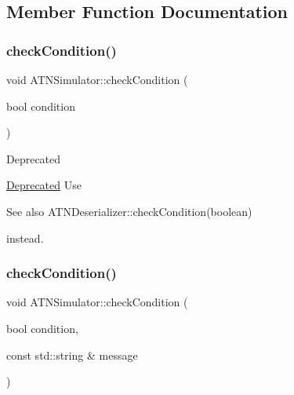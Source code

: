 \subsection{Member Function Documentation}
\mbox{\label{classantlr4_1_1atn_1_1ATNSimulator_aa827be017f3bf3a431ef91972d38e3d1}} 
\subsubsection{\texorpdfstring{check\+Condition()}{checkCondition()}\hspace{0.1cm}{\footnotesize\ttfamily [1/2]}}
{\footnotesize\ttfamily void A\+T\+N\+Simulator\+::check\+Condition (\begin{DoxyParamCaption}\item[{bool}]{condition }\end{DoxyParamCaption})\hspace{0.3cm}{\ttfamily [static]}}

\begin{DoxyRefDesc}{Deprecated}
\item[\hyperlink{deprecated__deprecated000002}{Deprecated}]Use \begin{DoxySeeAlso}{See also}
A\+T\+N\+Deserializer\+::check\+Condition(boolean)


\end{DoxySeeAlso}
instead. \end{DoxyRefDesc}
\mbox{\label{classantlr4_1_1atn_1_1ATNSimulator_a394cdeb1e2d6028bc73e0f1d22830b3d}} 
\subsubsection{\texorpdfstring{check\+Condition()}{checkCondition()}\hspace{0.1cm}{\footnotesize\ttfamily [2/2]}}
{\footnotesize\ttfamily void A\+T\+N\+Simulator\+::check\+Condition (\begin{DoxyParamCaption}\item[{bool}]{condition,  }\item[{const std\+::string \&}]{message }\end{DoxyParamCaption})\hspace{0.3cm}{\ttfamily [static]}}

